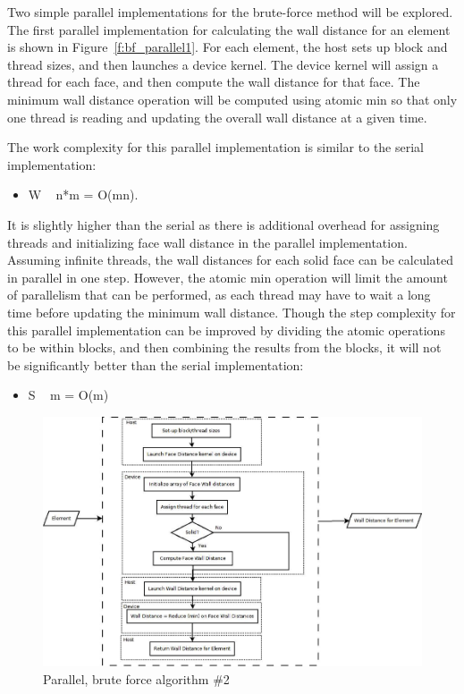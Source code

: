 \documentclass[]{aiaa-tc}%
\begin{document}
Two simple parallel implementations for the brute-force method will be explored.  The first parallel implementation for calculating the wall distance for an element is shown in Figure~\ref{f:bf_parallel1}.  For each element, the host sets up block and thread sizes, and then launches a device kernel.  The device kernel will assign a thread for each face, and then compute the wall distance for that face.  The minimum wall distance operation will be computed using atomic min so that only one thread is reading and updating the overall wall distance at a given time. 

The work complexity for this parallel implementation is similar to the
serial implementation:

\begin{itemize}
  \item W ~ n*m = O(mn).
\end{itemize}

It is slightly higher than the serial as there is additional overhead for assigning threads and initializing face wall distance in the parallel implementation.
Assuming infinite threads, the wall distances for each solid face can be calculated in parallel in one step.  However, the atomic min operation will limit the amount of parallelism that can be performed, as each thread may have to wait a long time before updating the minimum wall distance.  Though the step complexity for this parallel implementation can be improved by dividing the atomic operations to be within blocks, and then combining the results from the blocks, it will not be significantly better than the serial implementation:

\begin{itemize}
  \item S ~ m = O(m)
\end{itemize}


\begin{figure}
  \includegraphics{figures/brute_force/bf_parallel2_block}
  \caption{Parallel, brute force algorithm \#2}
  \label{f:bf_parallel2}
\end{figure}
\end{document}

